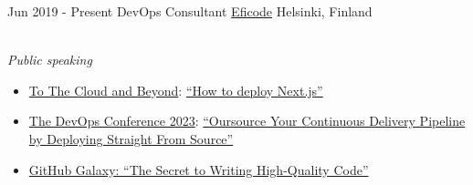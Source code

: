 \documentclass[a4paper]{twentysecondcv} %
\begin{document}
\begin{twentyshort} %
    \twentyitem
    	{Jun 2019 -}
		{Present}
        {DevOps Consultant}
		{\href{https://eficode.com}{Eficode}}
        {Helsinki, Finland}
        {
        \\ \emph{Public speaking}
        \begin{itemize}
			\item
			\href{https://www.eficode.com/events/to-the-cloud-and-beyond}{To The Cloud and Beyond}:  \href{https://www.youtube.com/watch?v=vokeBcAZYaQ}{``How to deploy Next.js''}
			
			\item 
			\href{https://www.thedevopsconference.com/videos?name=adriaan+knapen&topic=all&event=5}{The DevOps Conference 2023}: 
			\href{https://www.youtube.com/watch?v=mdWIfox5O_E}{``Oursource Your Continuous Delivery Pipeline by Deploying Straight From Source''}
			
			\item
			\href{https://galaxy.github.com/session/day-1-the-secret-to-writing-high-quality-code-more-efficiently}{GitHub Galaxy: ``The Secret to Writing High-Quality Code''}
			

\end{itemize}}
\end{twentyshort}
\end{document}
